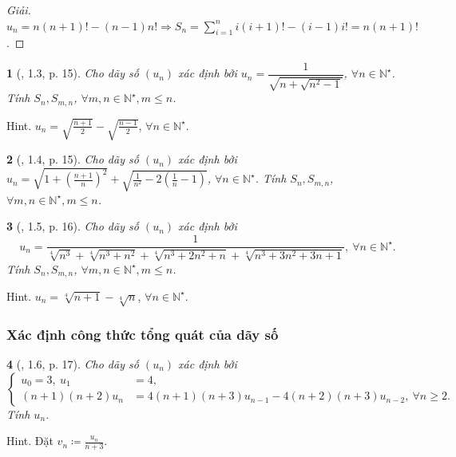 \documentclass{article}
\newtheorem{baitoan}{}
\begin{document}
\begin{proof}[Giải]
	$u_n = n(n + 1)! - (n - 1)n!\Rightarrow S_n = \sum_{i=1}^n i(i + 1)! - (i - 1)i! = n(n + 1)!$.
\end{proof}

\begin{baitoan}[\cite{Quoc_Long_Dat_Nam_VMC}, 1.3, p. 15]
	Cho dãy số $(u_n)$ xác định bởi $u_n = \dfrac{1}{\sqrt{n + \sqrt{n^2 - 1}}}$, $\forall n\in\mathbb{N}^\star$. Tính $S_n,S_{m,n}$, $\forall m,n\in\mathbb{N}^\star,m\le n$.
\end{baitoan}
{\sf Hint.} $u_n = \sqrt{\frac{n + 1}{2}} - \sqrt{\frac{n - 1}{2}}$, $\forall n\in\mathbb{N}^\star$.

\begin{baitoan}[\cite{Quoc_Long_Dat_Nam_VMC}, 1.4, p. 15]
	Cho dãy số $(u_n)$ xác định bởi $u_n = \sqrt{1 + \left(\frac{n + 1}{n}\right)^2} + \sqrt{\frac{1}{n^2} - 2\left(\frac{1}{n} - 1\right)}$, $\forall n\in\mathbb{N}^\star$. Tính $S_n,S_{m,n}$, $\forall m,n\in\mathbb{N}^\star,m\le n$.
\end{baitoan}

\begin{baitoan}[\cite{Quoc_Long_Dat_Nam_VMC}, 1.5, p. 16]
	Cho dãy số $(u_n)$ xác định bởi
	\begin{equation*}
		u_n = \frac{1}{\sqrt[4]{n^3} + \sqrt[4]{n^3 + n^2} + \sqrt[4]{n^3 + 2n^2 + n} + \sqrt[4]{n^3 + 3n^2 + 3n + 1}},\ \forall n\in\mathbb{N}^\star.
	\end{equation*}
	Tính $S_n,S_{m,n}$, $\forall m,n\in\mathbb{N}^\star,m\le n$.
\end{baitoan}
{\sf Hint.} $u_n = \sqrt[4]{n + 1} - \sqrt[4]{n}$, $\forall n\in\mathbb{N}^\star$.


\subsubsection{Xác định công thức tổng quát của dãy số}

\begin{baitoan}[\cite{Quoc_Long_Dat_Nam_VMC}, 1.6, p. 17]
	Cho dãy số $(u_n)$ xác định bởi
	\begin{equation*}
		\left\{\begin{split}
			u_0 = 3,\ u_1 &= 4,\\
			(n + 1)(n + 2)u_n &= 4(n + 1)(n + 3)u_{n-1} - 4(n + 2)(n + 3)u_{n-2},\ \forall n\ge2.
		\end{split}\right.
	\end{equation*}
	Tính $u_n$.
\end{baitoan}
{\sf Hint.} Đặt $v_n\coloneqq\frac{u_n}{n + 3}$.
\end{document}
